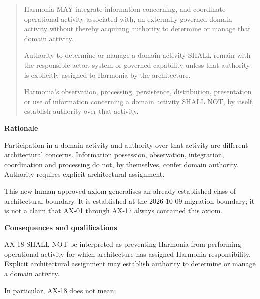 \begin{quote}


Harmonia MAY integrate information concerning, and coordinate operational activity associated with, an externally governed domain activity without thereby acquiring authority to determine or manage that domain activity.



Authority to determine or manage a domain activity SHALL remain with the responsible actor, system or governed capability unless that authority is explicitly assigned to Harmonia by the architecture.



Harmonia's observation, processing, persistence, distribution, presentation or use of information concerning a domain activity SHALL NOT, by itself, establish authority over that activity.



\end{quote}


\par\medskip\textbf{Rationale}\par


Participation in a domain activity and authority over that activity are
different architectural concerns. Information possession, observation,
integration, coordination and processing do not, by themselves, confer
domain authority. Authority requires explicit architectural assignment.



This new human-approved axiom generalises an already-established class of
architectural boundary. It is established at the 2026-10-09 migration
boundary; it is not a claim that AX-01 through AX-17 always contained this
axiom.



\par\medskip\textbf{Consequences and qualifications}\par


AX-18 SHALL NOT be interpreted as preventing Harmonia from performing
operational activity for which architecture has assigned Harmonia
responsibility. Explicit architectural assignment may establish authority
to determine or manage a domain activity.



In particular, AX-18 does not mean:



